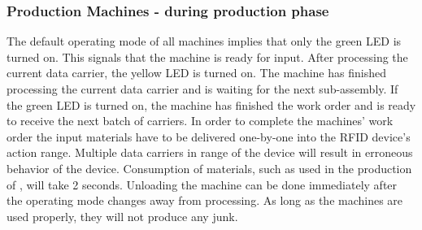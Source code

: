 \documentclass[12pt,twoside]{article}
\begin{document}
\subsubsection{Production Machines - during production phase}
The default operating mode of all machines implies that only the green LED is
turned on. This signals that the machine is ready for input. After processing
the current data carrier, the yellow LED is turned on.  The machine has finished
processing the current data carrier and is waiting for the next sub-assembly. If
the green LED is turned on, the machine has finished the work order and is ready
to receive the next batch of carriers. In order to complete the machines' work
order the input materials have to be delivered one-by-one into the RFID device's
action range. Multiple data carriers in range of the device will result in
erroneous behavior of the device. Consumption of materials, such as  used in
the production of , will take 2 seconds. Unloading the machine can be done
immediately after the operating mode changes away from  processing. As long as
the machines are used properly, they will not produce any junk.
\end{document}
